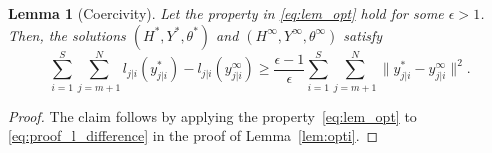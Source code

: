 \documentclass{article} %
\newtheorem{lem}{Lemma}
\begin{document}
\begin{lem}[Coercivity]\label{lem:coercivity}
	Let the property in \eqref{eq:lem_opt} hold for some $\epsilon>1$. Then, the solutions $(H^*,Y^*,\theta^*)$ and $(H^\infty,Y^\infty,\theta^\infty)$ satisfy
	\begin{equation}\label{eq:lem_coercive}
		\sum_{i=1}^{S}\sum_{j=m+1}^{N}l_{j|i}({y}_{j|i}^*)-l_{j|i}({y}^\infty_{j|i}) \geq \frac{\epsilon-1}{\epsilon} \sum_{i=1}^{S}\sum_{j=m+1}^{N}\|{y}^*_{j|i}-{y}_{j|i}^\infty\|^2.
	\end{equation}
\end{lem}
\begin{proof}
	The claim follows by applying the property~\eqref{eq:lem_opt} to \eqref{eq:proof_l_difference} in the proof of Lemma~\ref{lem:opti}.
\end{proof}
\end{document}
